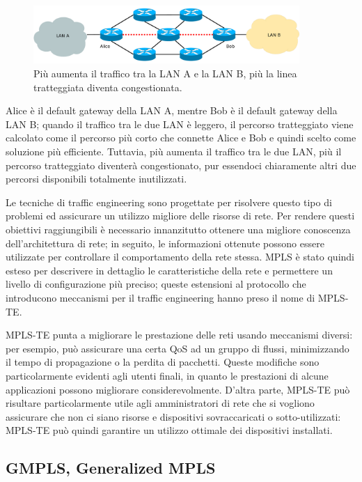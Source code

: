 \documentclass[10pt,a4paper]{report}
\begin{document}
\begin{figure}[!hbp]
  \centering
  \includegraphics[width=0.9\textwidth]{img/mpls_te}
  \caption[]{Più aumenta il traffico tra la LAN A e la LAN B, più la
    linea tratteggiata diventa congestionata.}
\end{figure}

Alice è il default gateway della LAN A, mentre Bob è il default
gateway della LAN B; quando il traffico tra le due LAN è leggero, il
percorso tratteggiato viene calcolato come il percorso più corto che
connette Alice e Bob e quindi scelto come soluzione più
efficiente. Tuttavia, più aumenta il traffico tra le due LAN, più il
percorso tratteggiato diventerà congestionato, pur essendoci
chiaramente altri due percorsi disponibili totalmente inutilizzati.

Le tecniche di traffic engineering sono progettate per risolvere
questo tipo di problemi ed assicurare un utilizzo migliore delle
risorse di rete. Per rendere questi obiettivi raggiungibili è
necessario innanzitutto ottenere una migliore conoscenza
dell'architettura di rete; in seguito, le informazioni ottenute
possono essere utilizzate per controllare il comportamento della rete
stessa. MPLS è stato quindi esteso per descrivere in dettaglio le
caratteristiche della rete e permettere un livello di configurazione
più preciso; queste estensioni al protocollo che introducono
meccanismi per il traffic engineering hanno preso il nome di MPLS-TE.

MPLS-TE punta a migliorare le prestazione delle reti usando meccanismi
diversi: per esempio, può assicurare una certa QoS ad un gruppo di
flussi, minimizzando il tempo di propagazione o la perdita di
pacchetti. Queste modifiche sono particolarmente evidenti agli utenti
finali, in quanto le prestazioni di alcune applicazioni possono
migliorare considerevolmente. D'altra parte, MPLS-TE può risultare
particolarmente utile agli amministratori di rete che si vogliono
assicurare che non ci siano risorse e dispositivi sovraccaricati o
sotto-utilizzati: MPLS-TE può quindi garantire un utilizzo ottimale
dei dispositivi installati.

\subsection*{GMPLS, Generalized MPLS}
\end{document}
